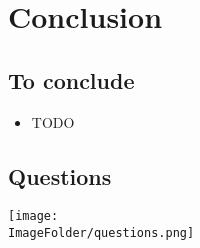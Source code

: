 %
%

\section{Conclusion}

\subsection{To conclude}
\begin{FrameWithSubSection}
    \begin{itemize}
            \item TODO
    \end{itemize}
\end{FrameWithSubSection}

\subsection{Questions}
\begin{FrameWithSubSection}
    \center
  \texttt{[image: \\ImageFolder/questions.png]}
\end{FrameWithSubSection}

